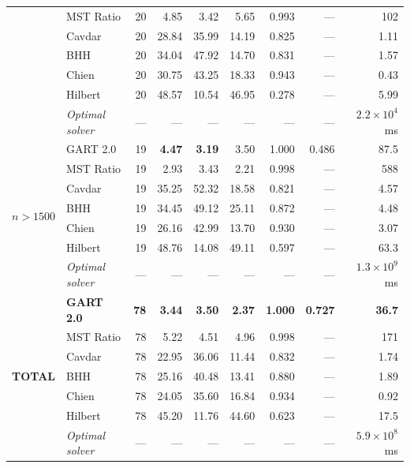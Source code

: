 \begin{table}[!ht]
{\begin{tabular}{@{}ll rrrrrrr@{}}
    & MST Ratio & 20 & 4.85 & 3.42 & 5.65 & 0.993 & --- & 102 \\
    & Cavdar & 20 & 28.84 & 35.99 & 14.19 & 0.825 & --- & 1.11 \\
    & BHH & 20 & 34.04 & 47.92 & 14.70 & 0.831 & --- & 1.57 \\
    & Chien & 20 & 30.75 & 43.25 & 18.33 & 0.943 & --- & 0.43 \\
    & Hilbert & 20 & 48.57 & 10.54 & 46.95 & 0.278 & --- & 5.99 \\
    & \textit{Optimal solver} & --- & --- & --- & --- & --- & --- & $2.2\times 10^{4}$~ms \\
    \midrule
    \multirow{7}{*}{$n > 1500$}
    & GART 2.0 & 19 & \textbf{4.47} & \textbf{3.19} & 3.50 & 1.000 & 0.486 & 87.5 \\
    & MST Ratio & 19 & 2.93 & 3.43 & 2.21 & 0.998 & --- & 588 \\
    & Cavdar & 19 & 35.25 & 52.32 & 18.58 & 0.821 & --- & 4.57 \\
    & BHH & 19 & 34.45 & 49.12 & 25.11 & 0.872 & --- & 4.48 \\
    & Chien & 19 & 26.16 & 42.99 & 13.70 & 0.930 & --- & 3.07 \\
    & Hilbert & 19 & 48.76 & 14.08 & 49.11 & 0.597 & --- & 63.3 \\
    & \textit{Optimal solver} & --- & --- & --- & --- & --- & --- & $1.3\times 10^{9}$~ms \\
    \midrule
    \multirow{7}{*}{\textbf{TOTAL}}
    & \textbf{GART 2.0} & \textbf{78} & \textbf{3.44} & \textbf{3.50} & \textbf{2.37} & \textbf{1.000} & \textbf{0.727} & \textbf{36.7} \\
    & MST Ratio & 78 & 5.22 & 4.51 & 4.96 & 0.998 & --- & 171 \\
    & Cavdar & 78 & 22.95 & 36.06 & 11.44 & 0.832 & --- & 1.74 \\
    & BHH & 78 & 25.16 & 40.48 & 13.41 & 0.880 & --- & 1.89 \\
    & Chien & 78 & 24.05 & 35.60 & 16.84 & 0.934 & --- & 0.92 \\
    & Hilbert & 78 & 45.20 & 11.76 & 44.60 & 0.623 & --- & 17.5 \\
    & \textit{Optimal solver} & --- & --- & --- & --- & --- & --- & $5.9\times 10^{8}$~ms \\
\bottomrule
\end{tabular}%
}
\end{table}

